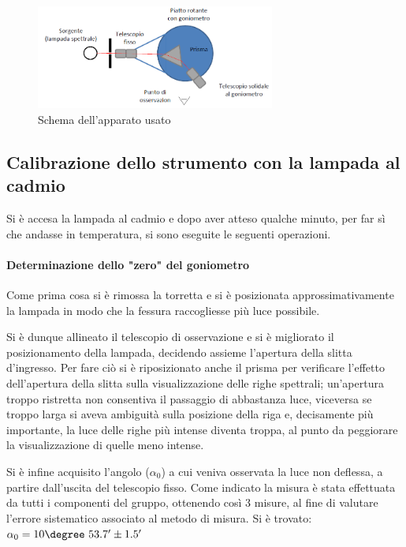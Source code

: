 \documentclass[a4paper,10pt]{article}
\begin{document}
\begin{figure}[H]
	\centering
	\includegraphics[width=0.7\textwidth]{../grafici/Schema1.png}
	\caption{Schema dell'apparato usato}
	\label{fig:schema1}
\end{figure}

\subsection{Calibrazione dello strumento con la lampada al cadmio}

Si è accesa la lampada al cadmio e dopo aver atteso qualche minuto, per far sì che andasse in temperatura, si sono eseguite le seguenti operazioni.

\paragraph{Determinazione dello "zero" del goniometro} Come prima cosa si è rimossa la torretta e si è posizionata approssimativamente la lampada in modo che la fessura raccogliesse più luce possibile. 

Si è dunque allineato il telescopio di osservazione e si è migliorato il posizionamento della lampada, decidendo assieme l'apertura della slitta d'ingresso. Per fare ciò si è riposizionato anche il prisma per verificare l'effetto dell'apertura della slitta sulla visualizzazione delle righe spettrali; un'apertura troppo ristretta non consentiva il passaggio di abbastanza luce, viceversa se troppo larga si aveva ambiguità sulla posizione della riga e, decisamente più importante, la luce delle righe più intense diventa troppa, al punto da peggiorare la visualizzazione di quelle meno intense.

Si è infine acquisito l'angolo ($\alpha_0$) a cui veniva osservata la luce non deflessa, a partire dall'uscita del telescopio fisso. Come indicato la misura è stata effettuata da tutti i componenti del gruppo, ottenendo così 3 misure, al fine di valutare l'errore sistematico associato al metodo di misura.
Si è trovato: $\alpha_0 = 10\degree~53.7'\pm 1.5'$
\end{document}
